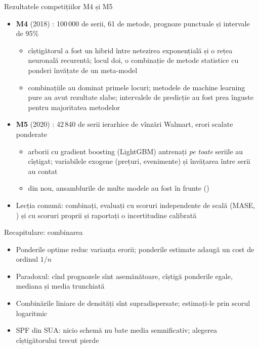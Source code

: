 \begin{frame}{Rezultatele competițiilor M4 și M5}
\itemsize{\small}
\begin{itemize}
    \item \textbf{M4} (2018) : 100\,000 de serii, 61 de metode, prognoze punctuale și intervale de 95\%
    \begin{itemize}
        \item cîștigătorul a fost un hibrid între netezirea exponențială și o rețea neuronală recurentă; locul doi, o combinație de metode statistice cu ponderi învățate de un meta-model
        \item combinațiile au dominat primele locuri; metodele de machine learning pure au avut rezultate slabe; intervalele de predicție au fost prea înguste pentru majoritatea metodelor
    \end{itemize}
    \item \textbf{M5} (2020) : 42\,840 de serii ierarhice de vînzări Walmart, erori scalate ponderate
    \begin{itemize}
        \item arborii cu gradient boosting (LightGBM) antrenați \emph{pe toate} seriile au cîștigat; variabilele exogene (prețuri, evenimente) și învățarea între serii au contat
        \item din nou, ansamblurile de multe modele au fost în frunte ()
    \end{itemize}
    \item Lecția comună: combinați, evaluați cu scoruri independente de scală (MASE, ) și cu scoruri proprii și raportați o incertitudine calibrată
\end{itemize}
\end{frame}

\begin{frame}{Recapitulare: combinarea}
\itemsize{\small}
\begin{itemize}
    \item Ponderile optime reduc varianța erorii; ponderile estimate adaugă un cost de ordinul $1/n$
    \item Paradoxul: cînd prognozele sînt asemănătoare, cîștigă ponderile egale, mediana și media trunchiată
    \item Combinările liniare de densități sînt supradispersate; estimați-le prin scorul logaritmic
    \item SPF din SUA: nicio schemă nu bate media semnificativ; alegerea cîștigătorului trecut pierde
\end{itemize}
\end{frame}


